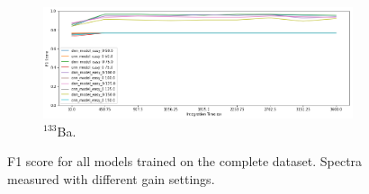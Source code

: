 \begin{figure}[H]
     \begin{subfigure}[b]{0.9\textwidth}
         \centering
         \includegraphics[width=\textwidth]{images/results_easy_distance_comparison}
         \caption{$^{133}$Ba.}
         \label{fig:results_easy_distance_comparison_full}
     \end{subfigure}

        \caption{F1 score for all models trained on the complete dataset. Spectra measured with different gain settings.}
        \label{fig:results_easy_distance_comparison}
\end{figure}


